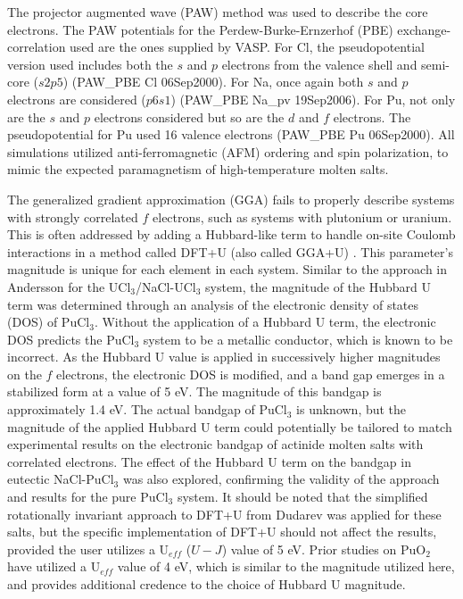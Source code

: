 \documentclass[review]{elsarticle}
\begin{document}
The projector augmented wave (PAW) method was used to describe the core electrons\cite{Kresse1996a,kresse1999ultrasoft}. The PAW potentials for the Perdew-Burke-Ernzerhof (PBE) \cite{perdew1996} exchange-correlation used are the ones supplied by VASP. For Cl, the pseudopotential version used includes both the $s$ and $p$ electrons from the valence shell and semi-core ($s2p5$) (PAW\_PBE Cl 06Sep2000). For Na, once again both $s$ and $p$ electrons are considered ($p6s1$) (PAW\_PBE Na\_pv 19Sep2006). For Pu, not only are the $s$ and $p$ electrons considered but so are the $d$ and $f$ electrons. The pseudopotential for Pu used 16 valence electrons (PAW\_PBE Pu 06Sep2000). All simulations utilized anti-ferromagnetic (AFM) ordering and spin polarization, to mimic the expected paramagnetism of high-temperature molten salts. 

The generalized gradient approximation (GGA) fails to properly describe systems with strongly correlated $f$ electrons, such as systems with plutonium or uranium. This is often addressed by adding a Hubbard-like term to handle on-site Coulomb interactions in a method called DFT+U (also called GGA+U) \cite{rohrbach2003electronic}. This parameter's magnitude is unique for each element in each system. Similar to the approach in Andersson \cite{ANDERSSON2022153836} for the UCl$_3$/NaCl-UCl$_3$ system, the magnitude of the Hubbard U term was determined through an analysis of the electronic density of states (DOS) of PuCl$_3$. Without the application of a Hubbard U term, the electronic DOS predicts the PuCl$_3$ system to be a metallic conductor, which is known to be incorrect. As the Hubbard U value is applied in successively higher magnitudes on the $f$ electrons, the electronic DOS is modified, and a band gap emerges in a stabilized form at a value of 5 eV. The magnitude of this bandgap is approximately 1.4 eV. The actual bandgap of PuCl$_3$ is unknown, but the magnitude of the applied Hubbard U term could potentially be tailored to match experimental results on the electronic bandgap of actinide molten salts with correlated electrons. The effect of the Hubbard U term on the bandgap in eutectic NaCl-PuCl$_3$ was also explored, confirming the validity of the approach and results for the pure PuCl$_3$ system. It should be noted that the simplified rotationally invariant approach to DFT+U from Dudarev \cite{Dudarev1998} was applied for these salts, but the specific implementation of DFT+U should not affect the results, provided the user utilizes a U$_{eff}$ ($U-J$) value of 5 eV. Prior studies on PuO$_2$ \cite{SUN2012} have utilized a U$_{eff}$ value of 4 eV, which is similar to the magnitude utilized here, and provides additional credence to the choice of Hubbard U magnitude. 
\end{document}
